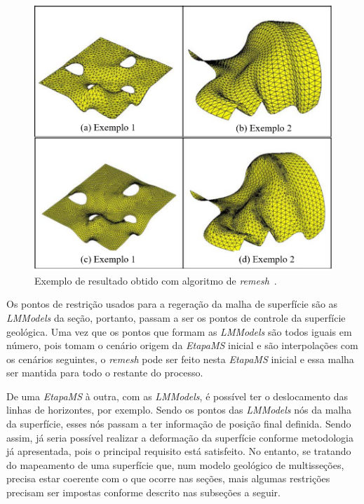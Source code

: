 \begin{figure} [H]
  \begin{center}
    \includegraphics[width=350pt]{images/fig-remesh}
    \caption{Exemplo de resultado obtido com algoritmo de \textit{remesh}~\cite{Miranda}.}\label{fig-remesh}
  \end{center}
\end{figure}

Os pontos de restrição usados para a regeração da malha de superfície são as \textit{LMModels} da seção, portanto, passam a ser os pontos de controle da superfície geológica. Uma vez que os pontos que formam as \textit{LMModels} são todos iguais em número, pois tomam o cenário origem da \textit{EtapaMS} inicial e são interpolações com os cenários seguintes, o \textit{remesh} pode ser feito nesta \textit{EtapaMS} inicial e essa malha ser mantida para todo o restante do processo.

De uma \textit{EtapaMS} à outra, com as \textit{LMModels}, é possível ter o deslocamento das linhas de horizontes, por exemplo. Sendo os pontos das \textit{LMModels} nós da malha da superfície, esses nós passam a ter informação de posição final definida. Sendo assim, já seria possível realizar a deformação da superfície conforme metodologia já apresentada, pois o principal requisito está satisfeito. No entanto, se tratando do mapeamento de uma superfície que, num modelo geológico de multisseções, precisa estar coerente com o que ocorre nas seções, mais algumas restrições precisam ser impostas conforme descrito nas subseções a seguir.

